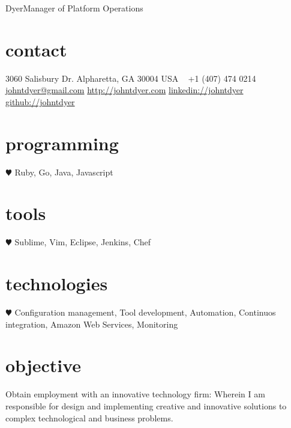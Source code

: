 \documentclass[]{friggeri-cv} %
\begin{document}
 { Dyer}{Manager of Platform Operations} %

\newcommand{\itab}[1]{\hspace{0em}\rlap{#1}}
\newcommand{\tab}[1]{\hspace{.2\textwidth}\rlap{#1}}



\begin{aside} %
  \section{contact}
    3060 Salisbury Dr.
    Alpharetta, GA 30004
    USA
    ~
    +1 (407) 474 0214
    ~
    \href{mailto:johntdyer@gmail.com}{johntdyer@gmail.com}
    \href{http://johntdyer.com}{http://johntdyer.com}
    \href{http://www.linkedin.com/in/johntdyer}{linkedin://johntdyer}
    \href{https://github.com/johntdyer}{github://johntdyer}
    \section{programming}
      {\color{red} $\varheartsuit$} Ruby, Go, Java, Javascript
    \section{tools}
      {\color{red} $\varheartsuit$} Sublime, Vim, Eclipse, Jenkins, Chef
    \section{technologies}
      {\color{red} $\varheartsuit$} Configuration management, Tool development, Automation, Continuos integration, Amazon Web Services, Monitoring
\end{aside}

%
%

\section{objective}
Obtain employment with an innovative technology firm: Wherein I am responsible for design and implementing creative and innovative solutions to complex technological and business problems.
\end{document}

